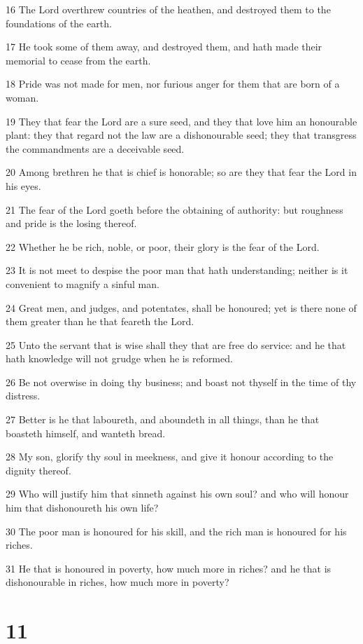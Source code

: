 \par 16 The Lord overthrew countries of the heathen, and destroyed them to the foundations of the earth.
\par 17 He took some of them away, and destroyed them, and hath made their memorial to cease from the earth.
\par 18 Pride was not made for men, nor furious anger for them that are born of a woman.
\par 19 They that fear the Lord are a sure seed, and they that love him an honourable plant: they that regard not the law are a dishonourable seed; they that transgress the commandments are a deceivable seed.
\par 20 Among brethren he that is chief is honorable; so are they that fear the Lord in his eyes.
\par 21 The fear of the Lord goeth before the obtaining of authority: but roughness and pride is the losing thereof.
\par 22 Whether he be rich, noble, or poor, their glory is the fear of the Lord.
\par 23 It is not meet to despise the poor man that hath understanding; neither is it convenient to magnify a sinful man.
\par 24 Great men, and judges, and potentates, shall be honoured; yet is there none of them greater than he that feareth the Lord.
\par 25 Unto the servant that is wise shall they that are free do service: and he that hath knowledge will not grudge when he is reformed.
\par 26 Be not overwise in doing thy business; and boast not thyself in the time of thy distress.
\par 27 Better is he that laboureth, and aboundeth in all things, than he that boasteth himself, and wanteth bread.
\par 28 My son, glorify thy soul in meekness, and give it honour according to the dignity thereof.
\par 29 Who will justify him that sinneth against his own soul? and who will honour him that dishonoureth his own life?
\par 30 The poor man is honoured for his skill, and the rich man is honoured for his riches.
\par 31 He that is honoured in poverty, how much more in riches? and he that is dishonourable in riches, how much more in poverty?

\chapter{11}

